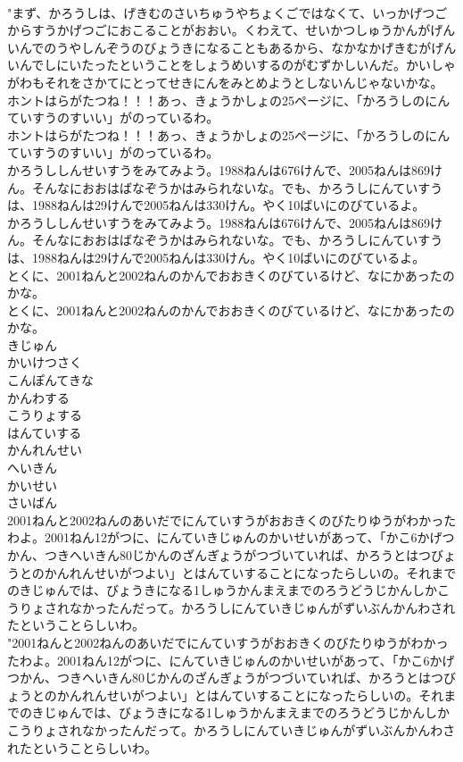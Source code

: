 \documentclass[8pt]{extreport}
\begin{document}
\begin{CJK}{UTF8}{min}
\\	"まず、かろうしは、げきむのさいちゅうやちょくごではなくて、いっかげつごからすうかげつごにおこることがおおい。くわえて、せいかつしゅうかんがげんいんでのうやしんぞうのびょうきになることもあるから、なかなかげきむがげんいんでしにいたったということをしょうめいするのがむずかしいんだ。かいしゃがわもそれをさかてにとってせきにんをみとめようとしないんじゃないかな。 
\\	ホントはらがたつね！！！あっ、きょうかしょの25ページに、「かろうしのにんていすうのすいい」がのっているわ。	
\\	ホントはらがたつね！！！あっ、きょうかしょの25ページに、「かろうしのにんていすうのすいい」がのっているわ。 
\\	かろうししんせいすうをみてみよう。1988ねんは676けんで、2005ねんは869けん。そんなにおおはばなぞうかはみられないな。でも、かろうしにんていすうは、1988ねんは29けんで2005ねんは330けん。やく10ばいにのびているよ。	
\\	かろうししんせいすうをみてみよう。1988ねんは676けんで、2005ねんは869けん。そんなにおおはばなぞうかはみられないな。でも、かろうしにんていすうは、1988ねんは29けんで2005ねんは330けん。やく10ばいにのびているよ。 
\\	とくに、2001ねんと2002ねんのかんでおおきくのびているけど、なにかあったのかな。	
\\	とくに、2001ねんと2002ねんのかんでおおきくのびているけど、なにかあったのかな。 
\\	きじゅん
\\	かいけつさく
\\	こんぽんてきな
\\	かんわする
\\	こうりょする
\\	はんていする
\\	かんれんせい
\\	へいきん
\\	かいせい
\\	さいばん
\\	2001ねんと2002ねんのあいだでにんていすうがおおきくのびたりゆうがわかったわよ。2001ねん12がつに、にんていきじゅんのかいせいがあって、「かこ6かげつかん、つきへいきん80じかんのざんぎょうがつづいていれば、かろうとはつびょうとのかんれんせいがつよい」とはんていすることになったらしいの。それまでのきじゅんでは、びょうきになる1しゅうかんまえまでのろうどうじかんしかこうりょされなかったんだって。かろうしにんていきじゅんがずいぶんかんわされたということらしいわ。	
\\	"2001ねんと2002ねんのあいだでにんていすうがおおきくのびたりゆうがわかったわよ。2001ねん12がつに、にんていきじゅんのかいせいがあって、「かこ6かげつかん、つきへいきん80じかんのざんぎょうがつづいていれば、かろうとはつびょうとのかんれんせいがつよい」とはんていすることになったらしいの。それまでのきじゅんでは、びょうきになる1しゅうかんまえまでのろうどうじかんしかこうりょされなかったんだって。かろうしにんていきじゅんがずいぶんかんわされたということらしいわ。 

\end{CJK}
\end{document}
